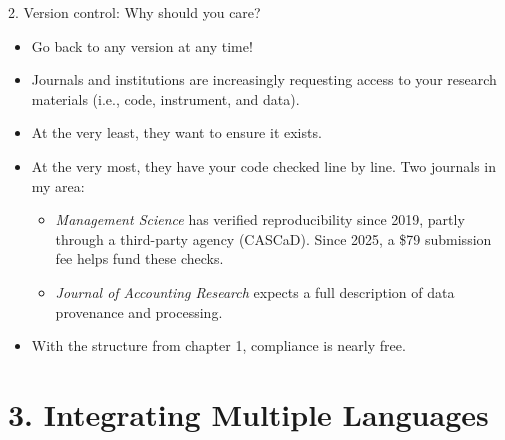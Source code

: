 \documentclass[
  ignorenonframetext,
  aspectratio=169,
]{beamer}
\providecommand{\tightlist}{%
  \setlength{\itemsep}{0pt}\setlength{\parskip}{0pt}}
\begin{document}
\begin{frame}{2. Version control: Why should you care?}
\label{version-control-why-should-you-care}
\begin{itemize}
\tightlist
\item
  Go back to any version at any time!
\item
  Journals and institutions are increasingly requesting access to your
  research materials (i.e., code, instrument, and data).
\item
  At the very least, they want to ensure it exists.
\item
  At the very most, they have your code checked line by line. Two
  journals in my area:

  \begin{itemize}
  \tightlist
  \item
    \emph{Management Science} has verified reproducibility since 2019,
    partly through a third-party agency (CASCaD). Since 2025, a \$79
    submission fee helps fund these checks.
  \item
    \emph{Journal of Accounting Research} expects a full description of
    data provenance and processing.
  \end{itemize}
\item
  With the structure from chapter 1, compliance is nearly free.
\end{itemize}
\end{frame}

\section{3. Integrating Multiple
Languages}\label{integrating-multiple-languages}
\end{document}
